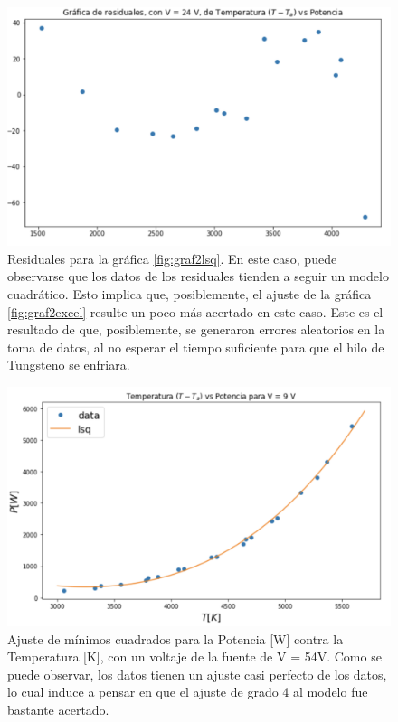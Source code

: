 \documentclass[%
 reprint,
 amsmath,amssymb,
 aps,
]{revtex4-1}
\begin{document}
\begin{figure}[H]
    \centering
    \includegraphics[scale= 0.3]{graf2res.png}
    \caption{Residuales para la gráfica \ref{fig:graf2lsq}. En este caso, puede observarse que los datos de los residuales tienden a seguir un modelo cuadrático. Esto implica que, posiblemente, el ajuste de la gráfica \ref{fig:graf2excel} resulte un poco más acertado en este caso. Este es el resultado de que, posiblemente, se generaron errores aleatorios en la toma de datos, al no esperar el tiempo suficiente para que el hilo de Tungsteno se enfriara.} 
    \label{fig:Figura 2}
\end{figure}

\begin{figure}[H]
    \centering
    \includegraphics[scale= 0.3]{graf3lsq.png}
    \caption{Ajuste de mínimos cuadrados para la Potencia [W] contra la Temperatura [K], con un voltaje de la fuente de V = 54V. Como se puede observar, los datos tienen un ajuste casi perfecto de los datos, lo cual induce a pensar en que el ajuste de grado 4 al modelo fue bastante acertado.}
    \label{fig:graf3lsq}
\end{figure}
\end{document}
